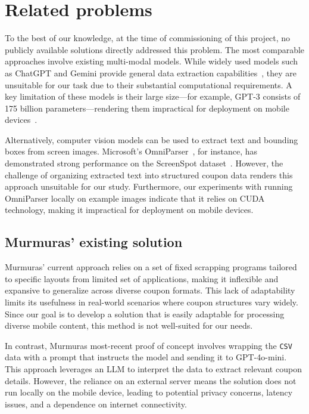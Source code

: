 \documentclass[licencjacka,en]{pracamgr}
\begin{document}
\chapter{Related problems}
To the best of our knowledge, at the time of commissioning of this project, no publicly available solutions directly addressed this problem. The most comparable approaches involve existing multi-modal models. While widely used models such as ChatGPT and Gemini provide general data extraction capabilities~\cite{brinkmann2023}, they are unsuitable for our task due to their substantial computational requirements. A key limitation of these models is their large size—for example, GPT-3 consists of 175 billion parameters\cite{chatgpt_params}—rendering them impractical for deployment on mobile devices~\cite{LinguaLinked}.

Alternatively, computer vision models can be used to extract text and bounding boxes from screen images. Microsoft’s OmniParser~\cite{omniparser_intro}, for instance, has demonstrated strong performance on the ScreenSpot dataset~\cite{omniparser_intro, cheng2024}. However, the challenge of organizing extracted text into structured coupon data renders this approach unsuitable for our study. Furthermore, our experiments with running OmniParser locally on example images indicate that it relies on CUDA technology, making it impractical for deployment on mobile devices.

\section{Murmuras' existing solution}
Murmuras' current approach relies on a set of fixed scrapping programs tailored to specific layouts from limited set of applications, making it inflexible and expansive to generalize across diverse coupon formats. This lack of adaptability limits its usefulness in real-world scenarios where coupon structures vary widely. Since our goal is to develop a solution that is easily adaptable for processing diverse mobile content, this method is not well-suited for our needs.

In contrast, Murmuras most-recent proof of concept involves wrapping the \texttt{CSV} data with a prompt that instructs the model and sending it to GPT-4o-mini. This approach leverages an LLM to interpret the data to extract relevant coupon details. However, the reliance on an external server means the solution does not run locally on the mobile device, leading to potential privacy concerns, latency issues, and a dependence on internet connectivity.
\end{document}
